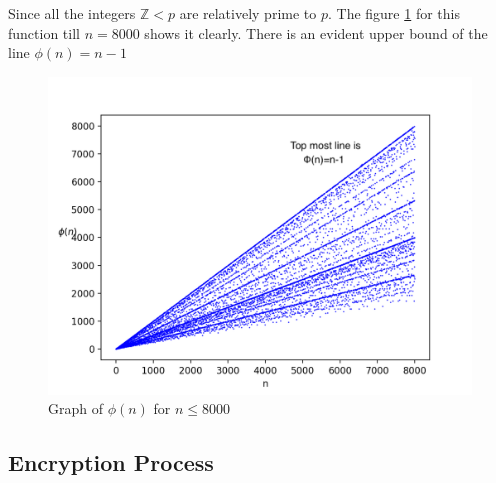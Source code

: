 \documentclass[a4paper,12pt]{article}
\theoremstyle{definition}
\begin{document}
Since all the integers $\mathbb{Z} < p$ are relatively prime to $p$. The figure \ref{phifigure} for this function till $n=8000$ shows it clearly. There is an evident upper bound of the line $\phi(n) =n-1$
\begin{figure}[H]
	 \centering
     \includegraphics[width=0.7\linewidth]{phi}
     \caption{Graph of $\phi(n)$ for $n \leq 8000$}
     \label{phifigure}	
\end{figure}


\subsection{Encryption Process} \label{rsaencryptionprocess}
\end{document}
